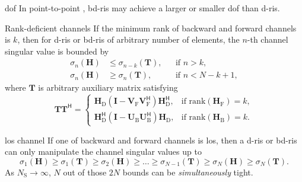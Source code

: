 \documentclass[final,xcolor={table}]{beamer}
\newlength{\colwidth}
\begin{document}
\begin{frame}[t]
\begin{columns}[t]
		\begin{column}{\colwidth}
			\vspace{-1cm}
			\begin{prop}{\gls{dof}}{}
				\setlength{\leftskip}{\leftmargini}
				\setlength{\rightskip}{\leftmargini}
				In point-to-point , \gls{bd}-\gls{ris} may achieve a larger or smaller \gls{dof} than \gls{d}-\gls{ris}.
			\end{prop}

			\begin{prop}{Rank-deficient channels}{}
				\setlength{\leftskip}{\leftmargini}
				\setlength{\rightskip}{\leftmargini}
				If the minimum rank of backward and forward channels is $k$,
				then for \gls{d}-\gls{ris} or \gls{bd}-\gls{ris} of arbitrary number of elements, the $n$-th channel singular value is bounded by
				\begin{align*}
					\sigma_n(\mathbf{H}) & \le \sigma_{n-k}(\mathbf{T}), &  & \text{if } n > k, \\
					\sigma_n(\mathbf{H}) & \ge \sigma_n(\mathbf{T}),     &  & \text{if } n < N - k + 1,
				\end{align*}
				where $\mathbf{T}$ is arbitrary auxiliary matrix satisfying
				\begin{equation*}
					\mathbf{T} \mathbf{T}^\mathsf{H} =
					\begin{cases}
						\mathbf{H}_\mathrm{D} (\mathbf{I} - \mathbf{V}_\mathrm{F} \mathbf{V}_\mathrm{F}^\mathsf{H}) \mathbf{H}_\mathrm{D}^\mathsf{H}, & \text{if } \mathrm{rank}(\mathbf{H}_\mathrm{F}) = k, \\
						\mathbf{H}_\mathrm{D}^\mathsf{H} (\mathbf{I} - \mathbf{U}_\mathrm{B} \mathbf{U}_\mathrm{B}^\mathsf{H}) \mathbf{H}_\mathrm{D}, & \text{if } \mathrm{rank}(\mathbf{H}_\mathrm{B}) = k.
					\end{cases}
				\end{equation*}
				\vspace{-0.5cm}
			\end{prop}

			\begin{coro}{\gls{los} channel}{}
				\setlength{\leftskip}{\leftmargini}
				\setlength{\rightskip}{\leftmargini}
				If one of backward and forward channels is \gls{los}, then a \gls{d}-\gls{ris} or \gls{bd}-\gls{ris} can only manipulate the channel singular values up to
				\begin{equation*}
					\sigma_1(\mathbf{H}) \ge \sigma_1(\mathbf{T}) \ge {\sigma_2(\mathbf{H})} \ge \ldots \ge \sigma_{N-1}(\mathbf{T}) \ge {\sigma_N(\mathbf{H})} \ge \sigma_N(\mathbf{T}).
				\end{equation*}
				As $N_\mathrm{S} \to \infty$, $N$ out of those $2N$ bounds can be \emph{simultaneously} tight.
			\end{coro}


\end{column}
\end{columns}
\end{frame}
\end{document}
